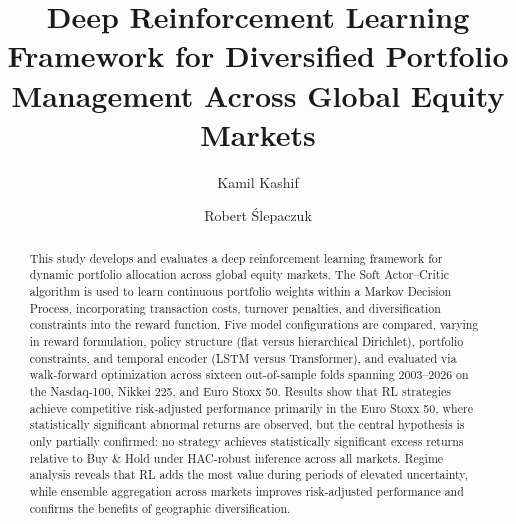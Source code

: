 \documentclass[]{elsarticle}
\begin{document}
\begin{frontmatter}

\title{Deep Reinforcement Learning Framework for Diversified Portfolio Management Across Global Equity Markets}

\vspace{1\baselineskip} %

\author[WNEUW]{Kamil Kashif}
   
\author[WNEUW2]{Robert Ślepaczuk}
   





  \begin{abstract}
This study develops and evaluates a deep reinforcement learning framework for dynamic portfolio allocation across global equity markets. The Soft Actor--Critic algorithm is used to learn continuous portfolio weights within a Markov Decision Process, incorporating transaction costs, turnover penalties, and diversification constraints into the reward function. Five model configurations are compared, varying in reward formulation, policy structure (flat versus hierarchical Dirichlet), portfolio constraints, and temporal encoder (LSTM versus Transformer), and evaluated via walk-forward optimization across sixteen out-of-sample folds spanning 2003--2026 on the Nasdaq-100, Nikkei 225, and Euro Stoxx 50. Results show that RL strategies achieve competitive risk-adjusted performance primarily in the Euro Stoxx 50, where statistically significant abnormal returns are observed, but the central hypothesis is only partially confirmed: no strategy achieves statistically significant excess returns relative to Buy \& Hold under HAC-robust inference across all markets. Regime analysis reveals that RL adds the most value during periods of elevated uncertainty, while ensemble aggregation across markets improves risk-adjusted performance and confirms the benefits of geographic diversification.
  \end{abstract}


\end{frontmatter}
\end{document}
